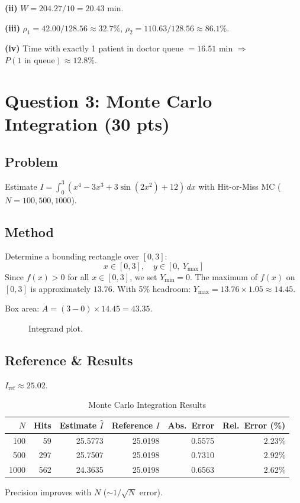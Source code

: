 \documentclass[12pt,a4paper]{article}
\begin{document}
\textbf{(ii)} $W = 204.27 / 10 = \boxed{20.43 \text{ min}}$.

\textbf{(iii)} $\rho_1 = 42.00/128.56 \approx \boxed{32.7\%}$, $\rho_2 = 110.63/128.56 \approx \boxed{86.1\%}$.

\textbf{(iv)} Time with exactly 1 patient in doctor queue $= 16.51$ min $\Rightarrow$ $P(\text{1 in queue}) \approx \boxed{12.8\%}$.

\section{Question 3: Monte Carlo Integration (30 pts)}

\subsection{Problem}
Estimate $I = \int_0^3 (x^4 - 3x^3 + 3\sin(2x^2) + 12)\,dx$ with Hit-or-Miss MC ($N=100,500,1000$).

\subsection{Method}
Determine a bounding rectangle over $[0,3]$:
\[
x \in [0,3], \quad y \in [0,\ Y_{\max}]
\]
Since $f(x) > 0$ for all $x \in [0,3]$, we set $Y_{\min} = 0$.
The maximum of $f(x)$ on $[0,3]$ is approximately $13.76$.
With 5\% headroom: $Y_{\max} = 13.76 \times 1.05 \approx 14.45$.

Box area: $A = (3-0) \times 14.45 = 43.35$.

\begin{figure}[H]
\centering
{}
\caption{Integrand plot.}
\end{figure}

\subsection{Reference \& Results}
$I_{\text{ref}} \approx 25.02$.

\begin{table}[H]
\centering
\caption{Monte Carlo Integration Results}
\begin{tabular}{rrrrrr}
\toprule
$N$ & Hits & Estimate $\hat{I}$ & Reference $I$ & Abs.\ Error & Rel.\ Error (\%) \\
\midrule
100  & 59  & 25.5773 & 25.0198 & 0.5575 & 2.23\% \\
500  & 297 & 25.7507 & 25.0198 & 0.7310 & 2.92\% \\
1000 & 562 & 24.3635 & 25.0198 & 0.6563 & 2.62\% \\
\bottomrule
\end{tabular}
\end{table}

Precision improves with $N$ ($\sim 1/\sqrt{N}$ error).
\end{document}
